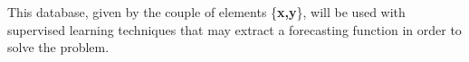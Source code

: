 This database, given by the couple of elements \{\textbf{x,y}\}, will be used with supervised learning techniques that may extract a forecasting function in order to solve the problem. \\




